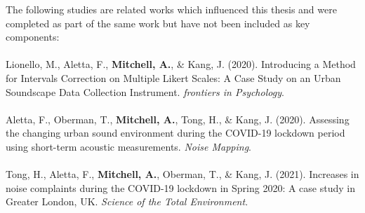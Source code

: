 \documentclass[twoside,fontsize=12pt,titlepage]{scrbook}
\begin{document}
\newpage
The following studies are related works which influenced this thesis and were completed as part of the same work but have not been included as key components:

\paragraph*{}Lionello, M., Aletta, F., \textbf{Mitchell, A.}, \& Kang, J. (2020). Introducing a Method for Intervals Correction on Multiple Likert Scales: A Case Study on an Urban Soundscape Data Collection Instrument. \emph{frontiers in Psychology}.

\paragraph*{}Aletta, F., Oberman, T., \textbf{Mitchell, A.}, Tong, H., \& Kang, J. (2020). Assessing the changing urban sound environment during the COVID-19 lockdown period using short-term acoustic measurements. \emph{Noise Mapping}.

\paragraph*{}Tong, H., Aletta, F., \textbf{Mitchell, A.}, Oberman, T., \& Kang, J. (2021). Increases in noise complaints during the COVID-19 lockdown in Spring 2020: A case study in Greater London, UK. \emph{Science of the Total Environment}.





\end{document}
